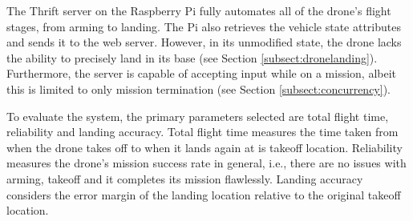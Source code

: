 The Thrift server on the Raspberry Pi fully automates all of the drone's flight stages, from arming to landing. The Pi also retrieves the vehicle state attributes and sends it to the web server. However, in its unmodified state, the drone lacks the ability to precisely land in its base (see Section \ref{subsect:dronelanding}). Furthermore, the server is capable of accepting input while on a mission, albeit this is limited to only mission termination (see Section \ref{subsect:concurrency}).

To evaluate the system, the primary parameters selected are total flight time, reliability and landing accuracy. Total flight time measures the time taken from when the drone takes off to when it lands again at is takeoff location. Reliability measures the drone's mission success rate in general, i.e., there are no issues with arming, takeoff and it completes its mission flawlessly. Landing accuracy considers the error margin of the landing location relative to the original takeoff location.



\FloatBarrier